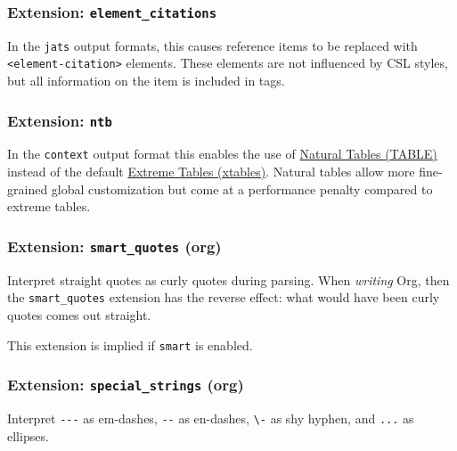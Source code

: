\documentclass[
]{article}
\begin{document}
\hypertarget{extension-element_citations}{%
\subsubsection{\texorpdfstring{Extension:
\texttt{element\_citations}}{Extension: element\_citations}}\label{extension-element_citations}}

In the \texttt{jats} output formats, this causes reference items to be
replaced with \texttt{\textless{}element-citation\textgreater{}}
elements. These elements are not influenced by CSL styles, but all
information on the item is included in tags.

\hypertarget{extension-ntb}{%
\subsubsection{\texorpdfstring{Extension:
\texttt{ntb}}{Extension: ntb}}\label{extension-ntb}}

In the \texttt{context} output format this enables the use of
\href{https://wiki.contextgarden.net/TABLE}{Natural Tables (TABLE)}
instead of the default
\href{https://wiki.contextgarden.net/xtables}{Extreme Tables (xtables)}.
Natural tables allow more fine-grained global customization but come at
a performance penalty compared to extreme tables.

\hypertarget{extension-smart_quotes-org}{%
\subsubsection{\texorpdfstring{Extension: \texttt{smart\_quotes}
(org)}{Extension: smart\_quotes (org)}}\label{extension-smart_quotes-org}}

Interpret straight quotes as curly quotes during parsing. When
\emph{writing} Org, then the \texttt{smart\_quotes} extension has the
reverse effect: what would have been curly quotes comes out straight.

This extension is implied if \texttt{smart} is enabled.

\hypertarget{extension-special_strings-org}{%
\subsubsection{\texorpdfstring{Extension: \texttt{special\_strings}
(org)}{Extension: special\_strings (org)}}\label{extension-special_strings-org}}

Interpret \texttt{-\/-\/-} as em-dashes, \texttt{-\/-} as en-dashes,
\texttt{\textbackslash{}-} as shy hyphen, and \texttt{...} as ellipses.
\end{document}
